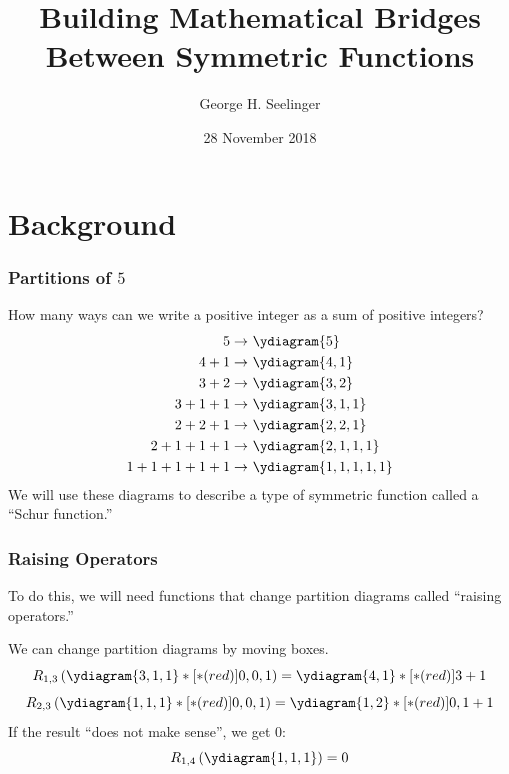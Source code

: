 \documentclass{beamer}
\title[Symmetric Functions]{Building Mathematical Bridges Between
  Symmetric Functions} %
\author[George H. Seelinger]{George H. Seelinger} %
\institute[JSF] %
{
Jefferson Scholars Foundation \\ %
\medskip
\textit{ghs9ae@virginia.edu} %
}
\date{28 November 2018} %
\begin{document}
\begin{frame}
\titlepage %
\end{frame}
\section{Background}
\begin{frame}
  \frametitle{Partitions of \(5\)}
  How many ways can we write a positive integer as a sum of positive
  integers? \pause
    \begin{align*}
    5 \to &\ \ydiagram{5}\\
    4+1 \to &\ \ydiagram{4,1}\\
    3+2 \to &\ \ydiagram{3,2}\\
    3+1+1 \to &\ \ydiagram{3,1,1}\\
    2+2+1 \to&\ \ydiagram{2,2,1}\\
    2+1+1+1 \to&\ \ydiagram{2,1,1,1} \\
    1+1+1+1+1 \to&\ \ydiagram{1,1,1,1,1}
    \end{align*}
  \pause We will use these diagrams to describe a type of symmetric
  function called a ``Schur function.''
\end{frame}
\begin{frame}
  \frametitle{Raising Operators}
  To do this, we will need functions that change partition diagrams
  called ``raising operators.'' \pause

  
  We can change partition diagrams by moving boxes.
  \[
    R_{1,3} \left( \ydiagram{3,1,1}*[*(red)]{0,0,1} \right) = \ydiagram{4,1}*[*(red)]{3+1}
  \]
  \[
    R_{2,3} \left( \ydiagram{1,1,1}*[*(red)]{0,0,1} \right) = \ydiagram{1,2}*[*(red)]{0,1+1}
  \]
\pause
If the result ``does not make sense'', we get \(0\): \[
  R_{1,4}\left( \ydiagram{1,1,1} \right) = 0
\]
\end{frame}
\end{document}
